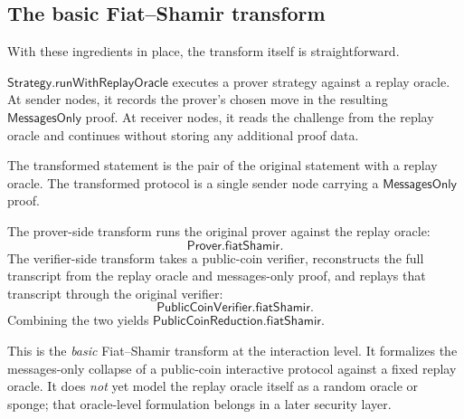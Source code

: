 \subsection{The basic Fiat--Shamir transform}

With these ingredients in place, the transform itself is straightforward.

\begin{definition}
  \label{int:run-with-replay-oracle}
  $\mathsf{Strategy.runWithReplayOracle}$ executes a prover strategy against a
  replay oracle.  At sender nodes, it records the prover's chosen move in the
  resulting $\mathsf{MessagesOnly}$ proof.  At receiver nodes, it reads the
  challenge from the replay oracle and continues without storing any additional
  proof data.
\end{definition}

\begin{definition}
  \label{int:interaction-fiat-shamir}
  The transformed statement is the pair of the original statement with a replay
  oracle.  The transformed protocol is a single sender node carrying a
  $\mathsf{MessagesOnly}$ proof.

  The prover-side transform runs the original prover against the replay oracle:
  \[
    \mathsf{Prover.fiatShamir}.
  \]
  The verifier-side transform takes a public-coin verifier, reconstructs the
  full transcript from the replay oracle and messages-only proof, and replays
  that transcript through the original verifier:
  \[
    \mathsf{PublicCoinVerifier.fiatShamir}.
  \]
  Combining the two yields
  $\mathsf{PublicCoinReduction.fiatShamir}$.
\end{definition}

\begin{remark}
  This is the \emph{basic} Fiat--Shamir transform at the interaction level.  It
  formalizes the messages-only collapse of a public-coin interactive protocol
  against a fixed replay oracle.  It does \emph{not} yet model the replay oracle
  itself as a random oracle or sponge; that oracle-level formulation belongs in
  a later security layer.
\end{remark}

